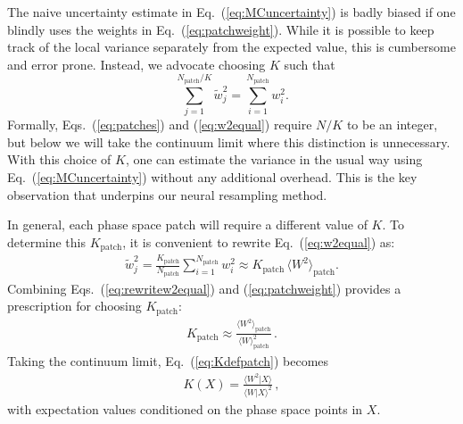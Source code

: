 \documentclass[prd,twocolumn,superscriptaddress,longbibliography,preprintnumbers,floatfix,nofootinbib]{revtex4-1}
\DeclareRobustCommand{\Eq}[1]{Eq.~(\ref{eq:#1})}
\DeclareRobustCommand{\Eqs}[2]{Eqs.~(\ref{eq:#1}) and (\ref{eq:#2})}
\begin{document}
The naive uncertainty estimate in \Eq{MCuncertainty} is badly biased if one blindly uses the weights in \Eq{patchweight}.
%
While it is possible to keep track of the local variance separately from the expected value, this is cumbersome and error prone.
%
Instead, we advocate choosing $K$ such that
%
\begin{equation}
\label{eq:w2equal}
\sum_{j=1}^{N_\text{patch}/K} \widetilde{w}_j^2 = \sum_{i=1}^{N_\text{patch}} w_i^2.
\end{equation}
%
Formally, \Eqs{patches}{w2equal} require $N/K$ to be an integer, but below we will take the continuum limit where this distinction is unnecessary.
%
With this choice of $K$, one can estimate the variance in the usual way using \Eq{MCuncertainty} without any additional overhead.
%
This is the key observation that underpins our neural resampling method.


In general, each phase space patch will require a different value of $K$.
%
To determine this $K_\text{patch}$, it is convenient to rewrite \Eq{w2equal} as:
%
\begin{align}
\label{eq:rewritew2equal}
\widetilde{w}_j^2=\frac{K_\text{patch}}{N_\text{patch}} \sum_{i=1}^{N_\text{patch}} w_i^2\approx K_\text{patch}\,\langle W^2\rangle_\text{patch}.
\end{align}
%
Combining \Eqs{rewritew2equal}{patchweight} provides a prescription for choosing $K_\text{patch}$:
%
\begin{align}
\label{eq:Kdefpatch}
K_\text{patch}\approx\frac{\langle W^2\rangle_\text{patch}}{\langle W\rangle_\text{patch}^2}\,.
\end{align}
%
Taking the continuum limit, \Eq{Kdefpatch} becomes
%
\begin{align}
\label{eq:Kdef}
K(X)=\frac{\langle W^2|X\rangle}{\langle W|X\rangle^2}\,,
\end{align}
%
with expectation values conditioned on the phase space points in $X$.
\end{document}
